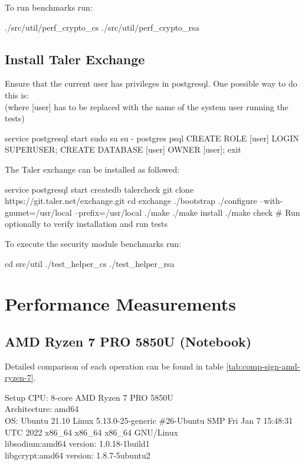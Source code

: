 To run benchmarks run:
\begin{ubuntu}
./src/util/perf_crypto_cs
./src/util/perf_crypto_rsa
\end{ubuntu}

\section{Install Taler Exchange}
\begin{bfhWarnBox}
Ensure that the current user has privileges in postgresql.
One possible way to do this is:\\
(where [user] has to be replaced with the name of the system user running the tests)
\begin{ubuntu}
service postgresql start
sudo su
su - postgres
psql
CREATE ROLE [user] LOGIN SUPERUSER;
CREATE DATABASE [user] OWNER [user];
exit
\end{ubuntu}
\end{bfhWarnBox}

The Taler exchange can be installed as followed:
\begin{ubuntu}
service postgresql start
createdb talercheck
git clone https://git.taler.net/exchange.git
cd exchange
./bootstrap
./configure --with-gnunet=/usr/local --prefix=/usr/local
./make
./make install
./make check # Run optionally to verify installation and run tests
\end{ubuntu}

To execute the security module benchmarks run:
\begin{ubuntu}
cd src/util
./test_helper_cs
./test_helper_rsa
\end{ubuntu}

\chapter{Performance Measurements}
\label{chap:app-perf}

\section{AMD Ryzen 7 PRO 5850U (Notebook)}
Detailed comparison of each operation can be found in table \ref{tab:comp-sign-amd-ryzen-7}.
\begin{bfhBox}{Setup}
	CPU: 8-core AMD Ryzen 7 PRO 5850U \\
    Architecture: amd64 \\
    OS: Ubuntu 21.10 Linux 5.13.0-25-generic \#26-Ubuntu SMP Fri Jan 7 15:48:31 UTC 2022 x86\_64 x86\_64 x86\_64 GNU/Linux \\
    libsodium:amd64 version: 1.0.18-1build1 \\ 
    libgcrypt:amd64 version: 1.8.7-5ubuntu2 
\end{bfhBox}


